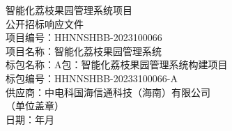 \documentclass[UTF8,a4paper,zihao=-4,fontset=none]{ctexart}
\newcommand{\BidTitle}{智能化荔枝果园管理系统项目}
\newcommand{\BidDocType}{公开招标响应文件}
\newcommand{\ProjectNo}{HHNNSHBB-2023100066}
\newcommand{\ProjectName}{智能化荔枝果园管理系统}
\newcommand{\PackageName}{A包：智能化荔枝果园管理系统构建项目}
\newcommand{\PackageNo}{HHNNSHBB-20233100066-A}
\newcommand{\SupplierName}{中电科国海信通科技（海南）有限公司}
\newcommand{\BidDate}{\the\year 年\the\month 月}
\begin{document}
\thispagestyle{empty}
\begin{center}
  {\heiti \BidTitle\\[8pt] \BidDocType}\\[36pt]
  {\songti 项目编号：\ProjectNo}\\[8pt]
  {\songti 项目名称：\ProjectName}\\[8pt]
  {\songti 标包名称：\PackageName}\\[8pt]
  {\songti 标包编号：\PackageNo}\\[24pt]
  {\heiti 供应商：\SupplierName}\\[8pt]
  {\songti （单位盖章）}\\[28pt]
  {\songti 日期：\BidDate}
\end{center}
\clearpage

\thispagestyle{empty}
\tableofcontents
\clearpage

\setcounter{page}{1}

\end{document}
